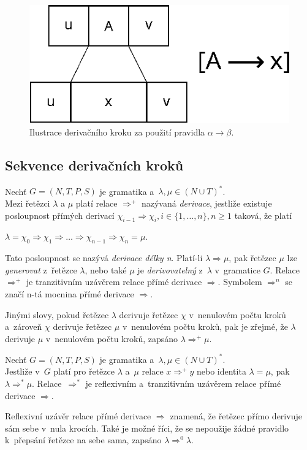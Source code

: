 \begin{figure}[ht]\label{fig_der_krok}
    \centering
    \includegraphics{obrazky-figures/derivacni_krok_bkg.eps}
    \caption{Ilustrace derivačního kroku za použití pravidla $\alpha \rightarrow \beta$.}
\end{figure}

\subsection*{Sekvence derivačních kroků}\label{kap_sekvence_der_kroku}
\begin{definition}\label{def_der_krok_tranz}
    Nechť $G = (N, T, P, S)$ je gramatika a~$\lambda, \mu \in (N \cup T)^*$. \\
    Mezi řetězci $\lambda$ a $\mu$ platí relace $\Rightarrow^+$ nazývaná \emph{derivace}, jestliže existuje posloupnost přímých derivací $\chi_{i-1} \Rightarrow \chi_i, i \in \{1, \ldots, n\}, n \geq 1$ taková, že platí
    \begin{center}
        $\lambda = \chi_0 \Rightarrow \chi_1 \Rightarrow \ldots \Rightarrow \chi_{n-1} \Rightarrow \chi_n = \mu$.
    \end{center}
    Tato posloupnost se nazývá \emph{derivace délky n}.
    Platí-li $\lambda \Rightarrow \mu$, pak řetězec $\mu$ lze \emph{generovat} z~řetězce $\lambda$, nebo také $\mu$ je \emph{derivovatelný} z~$\lambda$ v~gramatice $G$.
    Relace $\Rightarrow^+$ je tranzitivním uzávěrem relace přímé derivace $\Rightarrow$.
    Symbolem $\Rightarrow^n$ se značí n-tá mocnina přímé derivace $\Rightarrow$.
\end{definition}
Jinými slovy, pokud řetězec $\lambda$ derivuje řetězec $\chi$ v~nenulovém počtu kroků a~zároveň $\chi$ derivuje řetězec $\mu$ v~nenulovém počtu kroků, pak je zřejmé, že $\lambda$ derivuje $\mu$ v~nenulovém počtu kroků, zapsáno $\lambda \Rightarrow^+ \mu$. 

\begin{definition}\label{def_der_krok_refl_tranz}
    Nechť $G = (N, T, P, S)$ je gramatika a~$\lambda, \mu \in (N \cup T)^*$. \\
    Jestliže v~$G$ platí pro řetězce $\lambda$ a~$\mu$ relace $x \Rightarrow^+ y$ nebo identita $\lambda = \mu$, pak $\lambda \Rightarrow^* \mu$.
    Relace~$\Rightarrow^*$ je reflexivním a~tranzitivním uzávěrem relace přímé derivace $\Rightarrow$.  
\end{definition}
Reflexivní uzávěr relace přímé derivace $\Rightarrow$ znamená, že řetězec přímo derivuje sám sebe v~nula krocích.
Také je možné říci, že se nepoužije žádné pravidlo k~přepsání řetězce na sebe sama, zapsáno $\lambda \Rightarrow^0 \lambda$.

